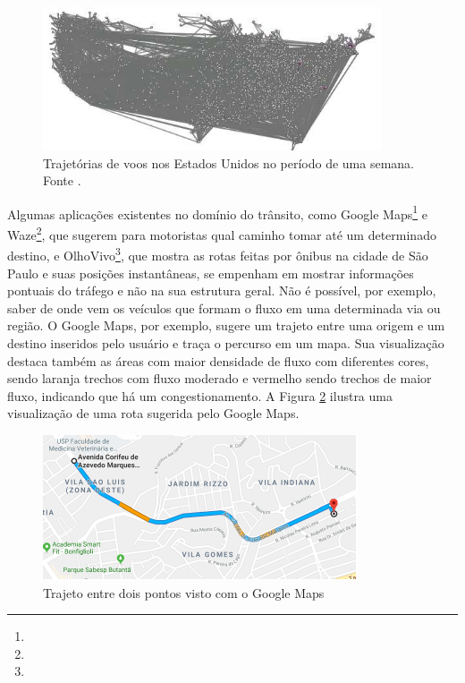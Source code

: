 \begin{figure}[!htb]
  \centering
  \includegraphics[width=100mm]{../figuras/cluttered-map.png}
  \caption[Trajetórias de voos nos Estados Unidos]{Trajetórias de voos nos Estados Unidos no período de uma semana. Fonte \citet{Zhou2013}.}
  \label{fig:exemplo-oclusao}
\end{figure}

  Algumas aplicações existentes no domínio do trânsito, como Google
Maps\footnote{} e
Waze\footnote{}, que sugerem para motoristas qual
caminho tomar até um determinado destino, e
OlhoVivo\footnote{}, que  mostra as rotas feitas
por ônibus na cidade de São Paulo e suas posições instantâneas, se empenham em
mostrar informações pontuais do tráfego e não na sua estrutura geral. Não é
possível, por exemplo, saber de onde vem os veículos que formam o fluxo em uma
determinada via ou região. O Google Maps, por exemplo, sugere um trajeto entre
uma origem e um destino inseridos pelo usuário e traça o percurso em um mapa.
Sua visualização destaca também as áreas com maior densidade de fluxo com
diferentes cores, sendo laranja trechos com fluxo moderado e vermelho sendo
trechos de maior fluxo, indicando que há um congestionamento. A Figura
\ref{fig:gmaps} ilustra uma visualização de uma rota sugerida pelo Google Maps.

\begin{figure}[!htb]
  \centering
  \includegraphics[width=\textwidth]{../figuras/maps.pdf}
  \caption{Trajeto entre dois pontos visto com o Google Maps \label{fig:gmaps}}
\end{figure}

